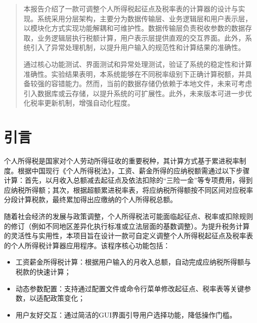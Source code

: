 \documentclass[a4paper, utf8]{ctexart}
\begin{document}
    \let\cleardoublepage\clearpage

    \maketitle

    \renewcommand{\abstractname}{\large \textbf{摘要}}
    \begin{abstract}
        本报告介绍了一款可调整个人所得税起征点及税率表的计算器的设计与实现。系统采用分层架构，主要分为数据传输层、业务逻辑层和用户表示层，以模块化方式实现功能解耦和可维护性。数据传输层负责税收参数的数据存取，业务逻辑层执行税额计算，用户表示层提供直观的交互界面。此外，系统引入了异常处理机制，以提升用户输入的规范性和计算结果的准确性。

        通过核心功能测试、界面测试和异常处理测试，验证了系统的稳定性和计算准确性。实验结果表明，本系统能够在不同税率级别下正确计算税额，并具备较强的容错能力。然而，当前的数据存储仍依赖于本地文件，未来可考虑引入数据库或云存储，以提升系统的可扩展性。此外，未来版本可进一步优化税率更新机制，增强自动化程度。
	
    \end{abstract}

    \section{引言}

    个人所得税是国家对个人劳动所得征收的重要税种，其计算方式基于累进税率制度。根据中国现行《个人所得税法》，工资、薪金所得的应纳税额需通过以下步骤计算：首先，以月收入总额减去起征点及依法扣除的“三险一金”等专项费用，得到应纳税所得额；其次，根据超额累进税率表，将应纳税所得额按不同区间对应税率分段计算税款，最终累加得出应缴纳的个人所得税总额。

    随着社会经济的发展与政策调整，个人所得税法可能面临起征点、税率或扣除规则的修订（例如不同地区差异化执行标准或立法层面的基数调整）。为提升税务计算的灵活性与实用性，本项目旨在设计一款可自定义调整个人所得税起征点及税率表的个人所得税计算器应用程序。该程序核心功能包括：

    \begin{itemize}[itemsep=2pt, topsep=0pt, parsep=0pt]
        \item 工资薪金所得税计算：根据用户输入的月收入总额，自动完成应纳税所得额与税款的快速计算；
        \item 动态参数配置：支持通过配置文件或命令行菜单修改起征点、税率表等关键参数，以适配政策变化；
        \item 用户友好交互：通过简洁的GUI界面引导用户选择功能，降低操作门槛。
    \end{itemize}
\end{document}
